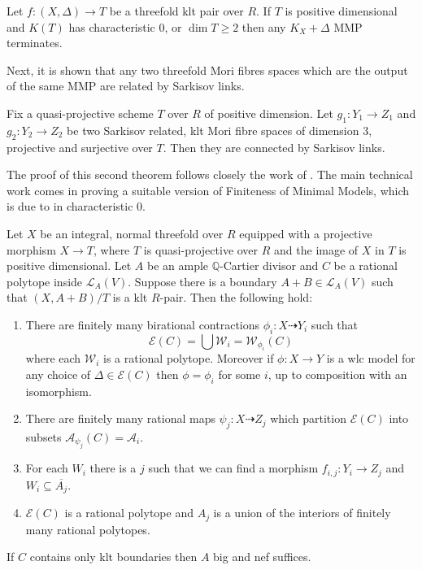 	\begin{theorem}\label{Main_Finite3}
		Let $f:(X,\Delta) \to T$ be a threefold klt pair over $R$. If $T$ is positive dimensional and $K(T)$ has characteristic $0$, or $\dim T \geq 2$ then any $K_{X}+\Delta$ MMP terminates.
	\end{theorem}

	Next, it is shown that any two threefold Mori fibres spaces which are the output of the same MMP are related by Sarkisov links.
	
	\begin{theorem}\label{Main_Finite2}
		Fix a quasi-projective scheme $T$ over $R$ of positive dimension. Let $g_{1}:Y_{1} \to Z_{1}$ and $g_{2}:Y_{2} \to Z_{2}$ be two Sarkisov related, klt Mori fibre spaces of dimension $3$, projective and surjective over $T$. Then they are connected by Sarkisov links.
	\end{theorem}
	
	The proof of this second theorem follows closely the work of \cite{hacon2009sarkisov}. The main technical work comes in proving a suitable version of Finiteness of Minimal Models, which is due to \cite{BCHM10} in characteristic $0$. 
	
		\begin{theorem}\label{Main_Finite1}
		Let $X$ be an integral, normal threefold over $R$ equipped with a projective morphism $X \to T$, where $T$ is quasi-projective over $R$ and the image of $X$ in $T$ is positive dimensional. Let $A$ be an ample $\mathbb{Q}$-Cartier divisor and $C$ be a rational polytope inside $\mathcal{L}_{A}(V)$. Suppose there is a boundary $A+B \in \mathcal{L}_{A}(V)$ such that $(X,A+B)/T$ is a klt $R$-pair. Then the following hold:
		\begin{enumerate}
			\item There are finitely many birational contractions $\phi_{i}:X \dashrightarrow Y_{i}$ such that 
			\[\mathcal{E}(C) = \bigcup \mathcal{W}_{i}=\mathcal{W}_{\phi_{i}}(C)\]
			where each $\mathcal{W}_{i}$ is a rational polytope. Moreover if $\phi:X \to Y$ is a wlc model for any choice of $\Delta \in \mathcal{E}(C)$ then $\phi=\phi_{i}$ for some $i$, up to composition with an isomorphism.
			
			\item There are finitely many rational maps $\psi_{j}:X \dashrightarrow Z_{j}$ which partition $\mathcal{E}(C)$ into subsets $\mathcal{A}_{\psi_{j}}(C)=\mathcal{A}_{i}$.
			\item  For each $W_{i}$ there is a $j$ such that we can find a morphism $f_{i,j}: Y_{i} \to Z_{j}$ and $W_{i} \subseteq \overline{A_{j}}$.
			\item  $\mathcal{E}(C)$ is a rational polytope and $A_{j}$ is a union of the interiors of finitely many rational polytopes.
		\end{enumerate}
	
	If $C$ contains only klt boundaries then $A$ big and nef suffices.
	\end{theorem}

